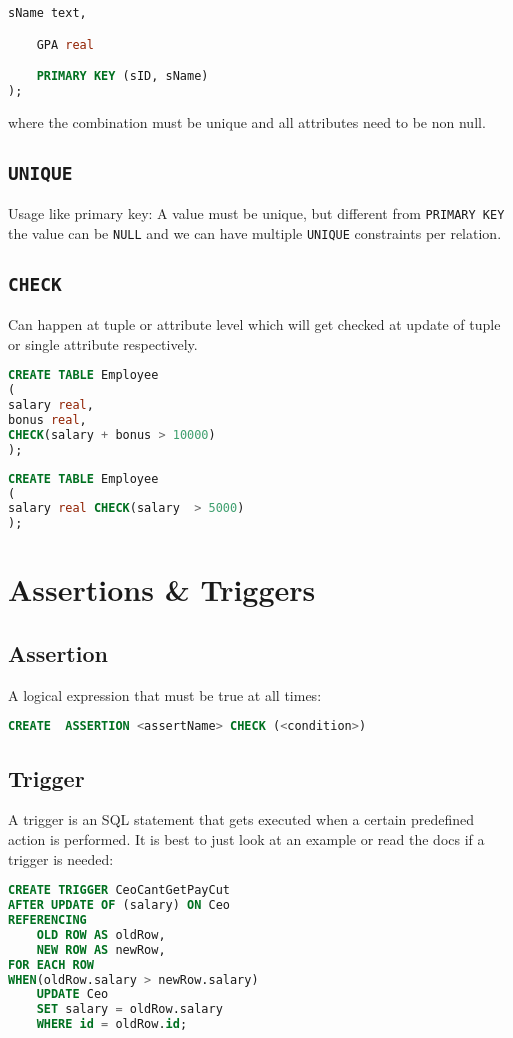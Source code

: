 \documentclass{sciposter}
\renewcommand{\t}[1]{\texttt{#1}}
\begin{document}
\begin{multicols}{3}
\begin{lstlisting}[language=SQL]
	sName text,

	GPA real

	PRIMARY KEY (sID, sName)
);
\end{lstlisting}
where the combination must be unique and all attributes need to be non null.
\subsection*{\t{UNIQUE}}
Usage like primary key: A value must be unique, but different from \t{PRIMARY KEY} the value can be \t{NULL} and we can have multiple \t{UNIQUE} constraints per relation.

\subsection*{\t{CHECK}}
Can happen at tuple or attribute level which will get checked at update of tuple or single attribute respectively.
\begin{lstlisting}[language=SQL]
CREATE TABLE Employee
(
salary real,
bonus real,
CHECK(salary + bonus > 10000)
);
\end{lstlisting}

\begin{lstlisting}[language=SQL]
CREATE TABLE Employee
(
salary real CHECK(salary  > 5000)
);
\end{lstlisting}


\section*{Assertions \& Triggers}

\subsection*{Assertion}
A logical expression that must be true at all times:
\begin{lstlisting}[language=SQL]
CREATE  ASSERTION <assertName> CHECK (<condition>)
\end{lstlisting}

\subsection*{Trigger}
A trigger is an SQL statement that gets executed when a certain predefined action is performed. It is best to just look at an example or read the docs if a trigger is needed:

\begin{lstlisting}[language=SQL]
CREATE TRIGGER CeoCantGetPayCut
AFTER UPDATE OF (salary) ON Ceo
REFERENCING
	OLD ROW AS oldRow,
	NEW ROW AS newRow,
FOR EACH ROW
WHEN(oldRow.salary > newRow.salary)
	UPDATE Ceo
	SET salary = oldRow.salary
	WHERE id = oldRow.id;
\end{lstlisting}



\newpage


\end{multicols}
\end{document}
